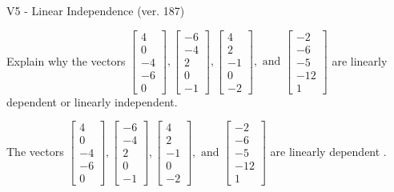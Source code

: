 \begin{exercise}
  \begin{exerciseTitle}V5 - Linear Independence (ver. 187)\end{exerciseTitle}
  \begin{exerciseStatement}
    Explain why the vectors \(\left[\begin{array}{r}
4 \\
0 \\
-4 \\
-6 \\
0
\end{array}\right] , \left[\begin{array}{r}
-6 \\
-4 \\
2 \\
0 \\
-1
\end{array}\right] , \left[\begin{array}{r}
4 \\
2 \\
-1 \\
0 \\
-2
\end{array}\right] , \text{ and } \left[\begin{array}{r}
-2 \\
-6 \\
-5 \\
-12 \\
1
\end{array}\right]\) are linearly dependent or linearly independent.	


  \end{exerciseStatement}
  \begin{exerciseAnswer}
   The vectors \(\left[\begin{array}{r}
4 \\
0 \\
-4 \\
-6 \\
0
\end{array}\right] , \left[\begin{array}{r}
-6 \\
-4 \\
2 \\
0 \\
-1
\end{array}\right] , \left[\begin{array}{r}
4 \\
2 \\
-1 \\
0 \\
-2
\end{array}\right] , \text{ and } \left[\begin{array}{r}
-2 \\
-6 \\
-5 \\
-12 \\
1
\end{array}\right]\) are 
  	 linearly dependent  .
  


  \end{exerciseAnswer}
\end{exercise}